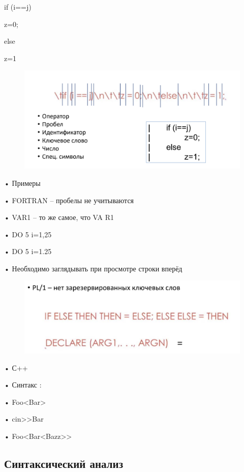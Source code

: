 \documentclass{article}
\begin{document}
if (i==j)

z=0;

else

z=1

\begin{figure}[H]
    \centering
    \includegraphics[width=1\linewidth]{Снимок экрана 2025-02-13 090834.png}
\end{figure}

• Примеры

• FORTRAN – пробелы не учитываются

• VAR1 – то же самое, что VA R1

• DO 5 i=1,25

• DO 5 i=1.25

• Необходимо заглядывать при просмотре строки вперёд

\begin{figure}[H]
    \centering
    \includegraphics[width=1\linewidth]{Снимок экрана 2025-02-13 091234.png}
\end{figure}


• С++

• Синтакс :

• Foo<Bar>

• cin>>Bar

• Foo<Bar<Bazz>>

\subsection{Синтаксический анализ}
\end{document}
